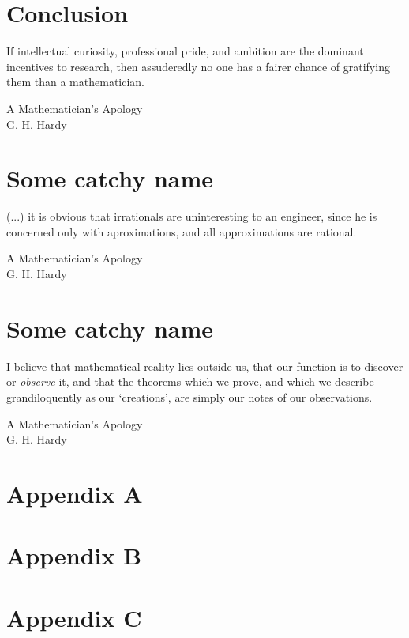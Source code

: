 \documentclass[12pt,letterpaper]{book}
\theoremstyle{definition} \newtheorem{definition}{Definición}[section]
\theoremstyle{plain} \newtheorem{theorem}{Teorema}[section]
\theoremstyle{plain} \newtheorem{lemma}{Lema}[section]
\theoremstyle{plain} \newtheorem{proposition}[theorem]{Proposici\'on}
\theoremstyle{plain} \newtheorem{corollary}[theorem]{Corolario}
\theoremstyle{plain} \newtheorem{remark}[theorem]{Comentario}
\begin{document}
\chapter{Conclusion}
\epigraph{If intellectual curiosity, professional pride, and ambition are the dominant incentives to research, then assuderedly no one has a fairer chance of gratifying them than a mathematician.}{A Mathematician's Apology \\ G. H. Hardy}


\chapter{Some catchy name}
\epigraph{(...) it is obvious that irrationals are uninteresting to an engineer, since he is concerned only with aproximations, and all approximations are rational.}{A Mathematician's Apology \\ G. H. Hardy}


\chapter{Some catchy name}
\epigraph{I believe that mathematical reality lies outside us, that our function is to discover or \emph{observe} it, and that the theorems which we prove, and which we describe grandiloquently as our `creations', are simply our notes of our observations.}{A Mathematician's Apology \\ G. H. Hardy}

\backmatter
\appendix
\chapter{Appendix A}

\chapter{Appendix B}

\chapter{Appendix C}

\cleardoublepage
{}


\cleardoublepage
\printindex
\end{document}
